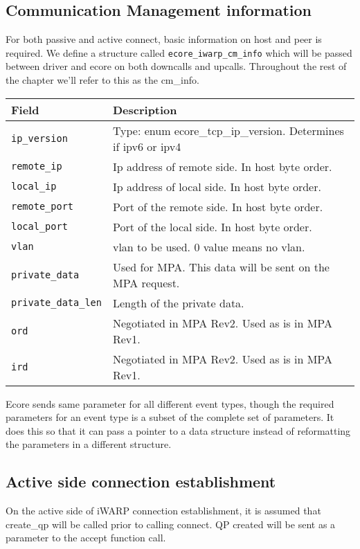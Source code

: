 \documentclass[11pt,fleqn,hidelinks,oneside]{book} %
\begin{document}
\subsection{Communication Management information}
\label{sec:cminfo}
For both passive and active connect, basic information on host and peer is required. We define a structure called \texttt{ecore\_iwarp\_cm\_info} which will be passed between driver and ecore on both downcalls and upcalls. Throughout the rest of the chapter we'll refer to this as the cm\_info. 
\begin{tabular}{| l | p{10cm} |}
 	\hline
 	\textbf{Field} & \textbf{Description} \\ \hline
 	\texttt{ip\_version} & Type: enum ecore\_tcp\_ip\_version. Determines if ipv6 or ipv4 \\ \hline
 	\texttt{remote\_ip} & Ip address of remote side. In host byte order. \\ \hline
 	\texttt{local\_ip} & Ip address of local side. In host byte order. \\ \hline
 	\texttt{remote\_port} & Port of the remote side. In host byte order. \\ \hline
 	\texttt{local\_port} & Port of the local side. In host byte order. \\ \hline
 	\texttt{vlan} & vlan to be used. 0 value means no vlan. \\ \hline
 	\texttt{private\_data} & Used for MPA. This data will be sent on the MPA request. \\ \hline
 	\texttt{private\_data\_len} & Length of the private data. \\ \hline
 	\texttt{ord} & Negotiated in MPA Rev2. Used as is in MPA Rev1. \\ \hline
 	\texttt{ird} & Negotiated in MPA Rev2. Used as is in MPA Rev1. \\ \hline
\end{tabular} 	
Ecore sends same parameter for all different event types, though the required parameters for an event type is a subset of the complete set of parameters. It does this so that it can pass a pointer to a data structure instead of reformatting the parameters in a different structure.

\subsection{Active side connection establishment}
On the active side of iWARP connection establishment, it is assumed that create\_qp will be called prior to calling connect. QP created will be sent as a parameter to the accept function call.
\end{document}
